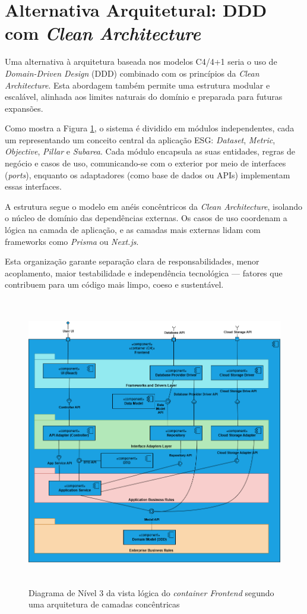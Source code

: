 \section{Alternativa Arquitetural: DDD com \textit{Clean Architecture}}
\label{sec:SolAlt}

Uma alternativa à arquitetura baseada nos modelos C4/4+1 seria o uso de \textit{Domain-Driven Design} (DDD) combinado com os princípios da \textit{Clean Architecture}. Esta abordagem também permite uma estrutura modular e escalável, alinhada aos limites naturais do domínio e preparada para futuras expansões.

Como mostra a Figura \ref{fig:alternativeModel}, o sistema é dividido em módulos independentes, cada um representando um conceito central da aplicação ESG: \textit{Dataset}, \textit{Metric}, \textit{Objective}, \textit{Pillar} e \textit{Subarea}. Cada módulo encapsula as suas entidades, regras de negócio e casos de uso, comunicando-se com o exterior por meio de interfaces (\textit{ports}), enquanto os adaptadores (como base de dados ou APIs) implementam essas interfaces.

A estrutura segue o modelo em anéis concêntricos da \textit{Clean Architecture}, isolando o núcleo de domínio das dependências externas. Os casos de uso coordenam a lógica na camada de aplicação, e as camadas mais externas lidam com frameworks como \textit{Prisma} ou \textit{Next.js}.

Esta organização garante separação clara de responsabilidades, menor acoplamento, maior testabilidade e independência tecnológica — fatores que contribuem para um código mais limpo, coeso e sustentável.

\begin{figure}[H]
    \centering
    \includegraphics[height=5in,keepaspectratio]{frontmatter/assets/diagrams/AlternativeModel.drawio.png}
    \caption{Diagrama de Nível 3 da vista lógica do \textit{container Frontend} segundo uma arquitetura de camadas concêntricas}
    \label{fig:alternativeModel}
\end{figure}